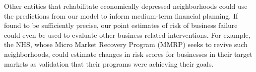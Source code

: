 Other entities that rehabilitate economically depressed neighborhoods could use the predictions from our model to inform medium-term financial planning. If found to be sufficiently precise, our point estimates of risk of business failure could even be used to evaluate other business-related interventions. For example, the NHS, whose Micro Market Recovery Program (MMRP) seeks to revive such neighborhoods, could estimate changes in risk scores for businesses in their target markets as validation that their programs were achieving their goals.

